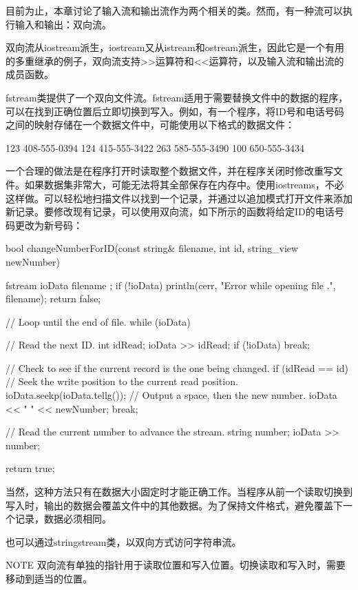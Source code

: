 目前为止，本章讨论了输入流和输出流作为两个相关的类。然而，有一种流可以执行输入和输出：双向流。

双向流从iostream派生，iostream又从istream和ostream派生，因此它是一个有用的多重继承的例子，双向流支持>{}>运算符和<{}<运算符，以及输入流和输出流的成员函数。

fstream类提供了一个双向文件流。fstream适用于需要替换文件中的数据的程序，可以在找到正确位置后立即切换到写入。例如，有一个程序，将ID号和电话号码之间的映射存储在一个数据文件中，可能使用以下格式的数据文件：

\begin{shell}
123 408-555-0394
124 415-555-3422
263 585-555-3490
100 650-555-3434
\end{shell}

一个合理的做法是在程序打开时读取整个数据文件，并在程序关闭时修改重写文件。如果数据集非常大，可能无法将其全部保存在内存中。使用iostreams，不必这样做。可以轻松地扫描文件以找到一个记录，并通过以追加模式打开文件来添加新记录。要修改现有记录，可以使用双向流，如下所示的函数将给定ID的电话号码更改为新号码：

\begin{cpp}
bool changeNumberForID(const string& filename, int id, string_view newNumber)
{
    fstream ioData { filename };
    if (!ioData) {
        println(cerr, "Error while opening file {}.", filename);
        return false;
    }

    // Loop until the end of file.
    while (ioData) {
        // Read the next ID.
        int idRead;
        ioData >> idRead;
        if (!ioData) { break; }

        // Check to see if the current record is the one being changed.
        if (idRead == id) {
            // Seek the write position to the current read position.
            ioData.seekp(ioData.tellg());
            // Output a space, then the new number.
            ioData << " " << newNumber;
            break;
        }

        // Read the current number to advance the stream.
        string number;
        ioData >> number;
    }
    return true;
}
\end{cpp}

当然，这种方法只有在数据大小固定时才能正确工作。当程序从前一个读取切换到写入时，输出的数据会覆盖文件中的其他数据。为了保持文件格式，避免覆盖下一个记录，数据必须相同。

也可以通过stringstream类，以双向方式访问字符串流。

\begin{myNotic}{NOTE}
双向流有单独的指针用于读取位置和写入位置。切换读取和写入时，需要移动到适当的位置。
\end{myNotic}















